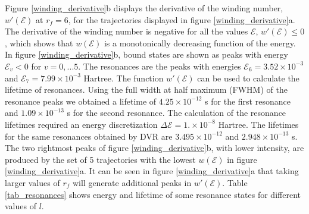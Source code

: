 \documentclass[%
 aip,
 numerical,
 jcp,
 floatfix,
rsi,%
amsmath,amssymb,
reprint,%
author-year%
]{revtex4-1}
\begin{document}
Figure \ref{winding_derivative}b displays the derivative of the winding number, $w'(\mathcal{E})$ at $r_f=6$, for the trajectories displayed in figure \ref{winding_derivative}a. The derivative of the winding number is negative for all the values $\mathcal{E}$, $w'(\mathcal{E})\leq0$, which shows that $w(\mathcal{E})$ is a monotonically decreasing function of the energy. In figure \ref{winding_derivative}b, bound states are shown as peaks with energy $\mathcal{E}_v<0$ for $v=0,...5$. The resonances are the peaks with energies $\mathcal{E}_6=3.52\times10^{-3}$ and $\mathcal{E}_7=7.99\times10^{-3}$ Hartree. The function $w'(\mathcal{E})$ can be used to calculate the lifetime of resonances. Using the full width at half maximum (FWHM) of the resonance peaks we obtained a lifetime of $4.25\times10^{-12}$ s for the first resonance and $1.09\times10^{-13}$ s for the second resonance. The calculation of the resonance lifetimes required an energy discretization $\Delta\mathcal{E}=1.\times10^{-8}$ Hartree. The lifetimes for the same resonances obtained by DVR \cite{Perez2019} are $3.495\times10^{-12}$ and $2.948\times10^{-13}$ s. The two rightmost peaks of figure \ref{winding_derivative}b, with lower intensity, are produced by the set of 5 trajectories with the lowest $w(\mathcal{E})$ in figure \ref{winding_derivative}a. It can be seen in figure \ref{winding_derivative}a that taking larger values of $r_f$ will generate additional peaks in $w'(\mathcal{E})$. Table \ref{tab_resonances} shows energy and lifetime of some resonance states for different values of $l$.
\end{document}
